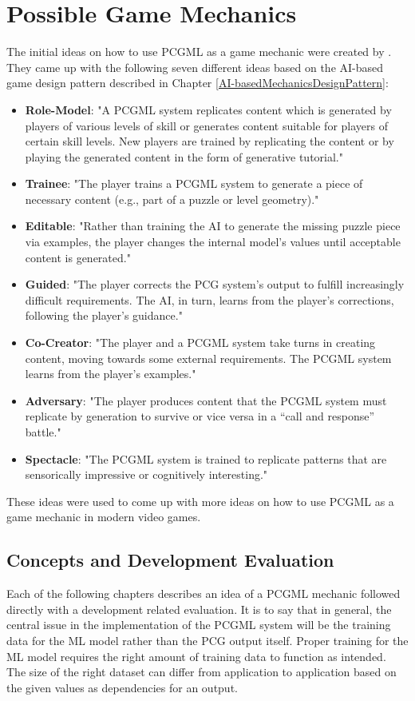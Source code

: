 \documentclass[MGS,Master,english]{twbook}%
\begin{document}
\chapter{Possible Game Mechanics} \label{chapter::possibleGameMechanics}
The initial ideas on how to use PCGML as a game mechanic were created by \citep{pcgml::paper}. They came up with the following seven different ideas based on the AI-based game design pattern described in Chapter \ref{AI-basedMechanicsDesignPattern}:
\begin{itemize}
	\item \textbf{Role-Model}: "A \ac{PCGML} system replicates content which is generated by players of various levels of skill or generates content suitable for players of certain skill levels. New players are trained by replicating the content or by playing the generated content in the form of generative tutorial." \cite{pcgml::paper}
	\item \textbf{Trainee}: "The player trains a \ac{PCGML} system to generate a piece of necessary content (e.g., part of a puzzle or level geometry)." \cite{pcgml::paper}
	\item \textbf{Editable}: "Rather than training the AI to generate the missing puzzle piece via examples, the player changes the internal model’s values until acceptable content is generated." \cite{pcgml::paper}
	\item \textbf{Guided}: "The player corrects the \ac{PCG} system’s output to fulfill increasingly difficult requirements. The \ac{AI}, in turn, learns from the player’s corrections, following the player’s guidance." \cite{pcgml::paper}
	\item \textbf{Co-Creator}: "The player and a \ac{PCGML} system take turns in creating content, moving towards some external requirements. The \ac{PCGML} system learns from the player’s examples." \cite{pcgml::paper} 
	\item \textbf{Adversary}: "The player produces content that the \ac{PCGML} system must replicate by generation to survive or vice versa in a “call and response” battle." \cite{pcgml::paper}
	\item \textbf{Spectacle}: "The \ac{PCGML} system is trained to replicate patterns that are sensorically impressive or cognitively interesting." \cite{pcgml::paper}
\end{itemize}
These ideas were used to come up with more ideas on how to use PCGML as a game mechanic in modern video games.

\section{Concepts and Development Evaluation}
Each of the following chapters describes an idea of a PCGML mechanic followed directly with a development related evaluation. It is to say that in general, the central issue in the implementation of the PCGML system will be the training data for the ML model rather than the PCG output itself. Proper training for the ML model requires the right amount of training data to function as intended. The size of the right dataset can differ from application to application based on the given values as dependencies for an output. 
\end{document}
